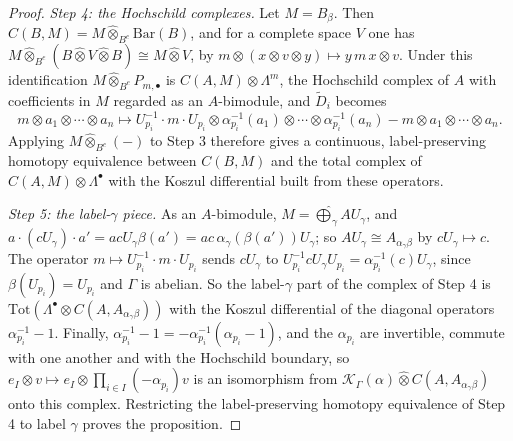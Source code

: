\documentclass[11pt]{amsart}
\theoremstyle{definition}
\theoremstyle{remark}
\begin{document}
\begin{proof}
\emph{Step 4: the Hochschild complexes.}  Let $M=B_{\beta}$.  Then
$C(B,M)=M\widehat\otimes_{B^{e}}\mathrm{Bar}(B)$, and for a complete space
$V$ one has $M\widehat\otimes_{B^{e}}(B\widehat\otimes V\widehat\otimes B)\cong
M\widehat\otimes V$, by $m\otimes(x\otimes v\otimes y)\mapsto y\,m\,x\otimes
v$.  Under this identification $M\widehat\otimes_{B^{e}}P_{m,\bullet}$ is
$C(A,M)\otimes\Lambda^{m}$, the Hochschild complex of $A$ with coefficients
in $M$ regarded as an $A$-bimodule, and $\widetilde D_i$ becomes
\[
m\otimes a_1\otimes\cdots\otimes a_n\mapsto
U_{p_i}^{-1}\cdot m\cdot U_{p_i}\otimes\alpha_{p_i}^{-1}(a_1)\otimes\cdots
\otimes\alpha_{p_i}^{-1}(a_n)-m\otimes a_1\otimes\cdots\otimes a_n .
\]
Applying $M\widehat\otimes_{B^{e}}(-)$ to Step 3 therefore gives a continuous,
label-preserving homotopy equivalence between $C(B,M)$ and the total complex
of $C(A,M)\otimes\Lambda^{\bullet}$ with the Koszul differential built from
these operators.

\emph{Step 5: the label-$\gamma$ piece.}  As an $A$-bimodule,
$M=\widehat\bigoplus_{\gamma}AU_{\gamma}$, and $a\cdot(cU_{\gamma})\cdot a'=
acU_{\gamma}\beta(a')=ac\,\alpha_{\gamma}(\beta(a'))U_{\gamma}$; so
$AU_{\gamma}\cong A_{\alpha_{\gamma}\beta}$ by $cU_{\gamma}\mapsto c$.  The
operator $m\mapsto U_{p_i}^{-1}\cdot m\cdot U_{p_i}$ sends $cU_{\gamma}$ to
$U_{p_i}^{-1}cU_{\gamma}U_{p_i}=\alpha_{p_i}^{-1}(c)U_{\gamma}$, since
$\beta(U_{p_i})=U_{p_i}$ and $\Gamma$ is abelian.  So the label-$\gamma$ part
of the complex of Step 4 is $\mathrm{Tot}(\Lambda^{\bullet}\otimes
C(A,A_{\alpha_{\gamma}\beta}))$ with the Koszul differential of the diagonal
operators $\alpha_{p_i}^{-1}-1$.  Finally, $\alpha_{p_i}^{-1}-1=
-\alpha_{p_i}^{-1}(\alpha_{p_i}-1)$, and the $\alpha_{p_i}$ are invertible,
commute with one another and with the Hochschild boundary, so $e_I\otimes v\mapsto e_I\otimes
\prod_{i\in I}(-\alpha_{p_i})v$ is an isomorphism from
$\mathcal K_{\Gamma}(\alpha)\widehat\otimes C(A,A_{\alpha_{\gamma}\beta})$ onto
this complex.  Restricting the label-preserving homotopy equivalence of Step
4 to label $\gamma$ proves the proposition.
\end{proof}
\end{document}
